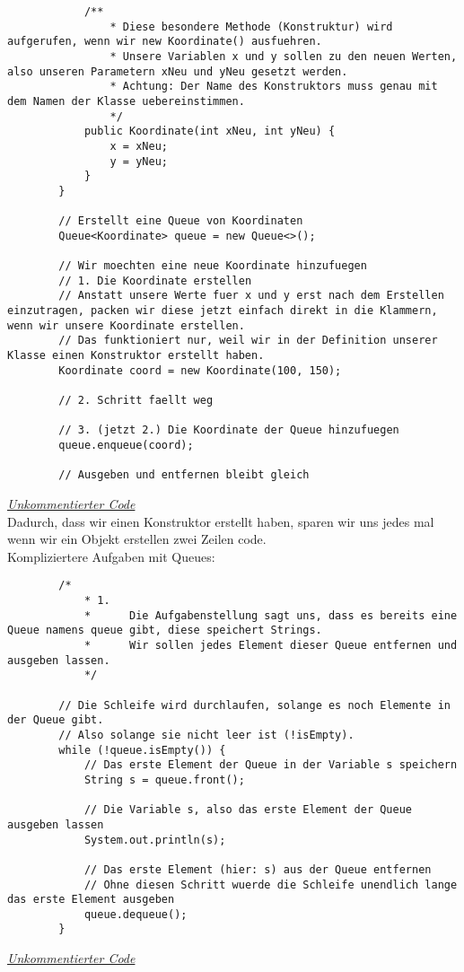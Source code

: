 \begin{flushleft}
\begin{lstlisting}
            /** 
                * Diese besondere Methode (Konstruktur) wird aufgerufen, wenn wir new Koordinate() ausfuehren.
                * Unsere Variablen x und y sollen zu den neuen Werten, also unseren Parametern xNeu und yNeu gesetzt werden.
                * Achtung: Der Name des Konstruktors muss genau mit dem Namen der Klasse uebereinstimmen.
                */
            public Koordinate(int xNeu, int yNeu) {
                x = xNeu;
                y = yNeu;
            }
        }
        
        // Erstellt eine Queue von Koordinaten
        Queue<Koordinate> queue = new Queue<>();
        
        // Wir moechten eine neue Koordinate hinzufuegen
        // 1. Die Koordinate erstellen
        // Anstatt unsere Werte fuer x und y erst nach dem Erstellen einzutragen, packen wir diese jetzt einfach direkt in die Klammern, wenn wir unsere Koordinate erstellen.
        // Das funktioniert nur, weil wir in der Definition unserer Klasse einen Konstruktor erstellt haben.
        Koordinate coord = new Koordinate(100, 150);

        // 2. Schritt faellt weg

        // 3. (jetzt 2.) Die Koordinate der Queue hinzufuegen
        queue.enqueue(coord);
    
        // Ausgeben und entfernen bleibt gleich
    \end{lstlisting}
    \href{https://raw.githubusercontent.com/tim-tm/informatik-notes/main/code/Queue_Beispiel3.java}{\textit{Unkommentierter Code}} \\
    Dadurch, dass wir einen Konstruktor erstellt haben, sparen wir uns jedes mal wenn wir ein Objekt erstellen zwei Zeilen code. \\
    Kompliziertere Aufgaben mit Queues:
    \begin{lstlisting}
        /*
            * 1. 
            *      Die Aufgabenstellung sagt uns, dass es bereits eine Queue namens queue gibt, diese speichert Strings.
            *      Wir sollen jedes Element dieser Queue entfernen und ausgeben lassen.
            */

        // Die Schleife wird durchlaufen, solange es noch Elemente in der Queue gibt.
        // Also solange sie nicht leer ist (!isEmpty).
        while (!queue.isEmpty()) {
            // Das erste Element der Queue in der Variable s speichern
            String s = queue.front();

            // Die Variable s, also das erste Element der Queue ausgeben lassen
            System.out.println(s);

            // Das erste Element (hier: s) aus der Queue entfernen
            // Ohne diesen Schritt wuerde die Schleife unendlich lange das erste Element ausgeben
            queue.dequeue();
        }
    \end{lstlisting}
    \href{https://raw.githubusercontent.com/tim-tm/informatik-notes/main/code/Queue_Beispiel4.java}{\textit{Unkommentierter Code}} \\
\end{flushleft}

